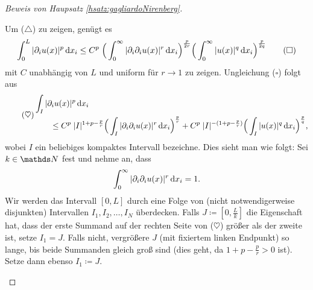 \begin{proof}[Beweis von Haupsatz \ref{hsatz:gagliardoNirenberg}]
\begin{enumerate}
      Um ($\triangle$) zu zeigen, genügt es
      \begin{align*}
        \int_0^L |\partial_i u(x)|^p \, {\operatorname{d}\!{x}}_i
        \leq C^p \; \Big( \int_0^\infty |\partial_i \partial_i u(x) |^r \, {\operatorname{d}\!{x}}_i \Big)^{\frac{p}{2r}} \Big( \int_0^\infty |u(x)|^q \, {\operatorname{d}\!{x}}_i \Big)^{\frac{p}{2q}}
        \tag{$\square$}
      \end{align*}
      mit $C$ unabhängig von $L$ und uniform für $r \to 1$ zu zeigen.
      Ungleichung ($\square$) folgt aus 
      \begin{align*} 
        \tag{$\heartsuit$}       
        \begin{split}
        &\int_I |\partial_i u(x)|^p \, {\operatorname{d}\!{x}}_i \\
        &\qquad \leq C^p \; |I|^{1 + p - \frac{p}{r}} \Big( \int_I |\partial_i \partial_i u(x)|^r \, {\operatorname{d}\!{x}}_i \Big)^{\frac{p}{r}} + C^p \; |I|^{-(1 + p - \frac{p}{r})} \Big( \int_I |u(x)|^q \, {\operatorname{d}\!{x}}_i \Big)^{\frac{p}{q}},
      \end{split}
      \end{align*}
      wobei $I$ ein beliebiges kompaktes Intervall bezeichne.
      Dies sieht man wie folgt: 
      Sei $k \in \N$ fest und nehme an, dass 
      $$
      \int_0^\infty |\partial_i \partial_i u(x)|^r \, {\operatorname{d}\!{x}}_i = 1.
      $$
      Wir werden das Intervall $[0,L]$ durch eine Folge von (nicht notwendigerweise disjunkten) Intervallen $I_1,I_2,\dots,I_N$ überdecken.
      Falls $J \coloneqq [0, \frac{L}{k}]$ die Eigenschaft hat, dass der erste Summand auf der rechten Seite von ($\heartsuit$) größer als der zweite ist, setze $I_1 = J$.
      Falls nicht, vergrößere $J$ (mit fixiertem linken Endpunkt) so lange, bis beide Summanden gleich groß sind (dies geht, da $1 + p - \frac{p}{r} > 0$ ist). 
      Setze dann ebenso $I_1 \coloneqq J$.


\end{enumerate}
\end{proof}
